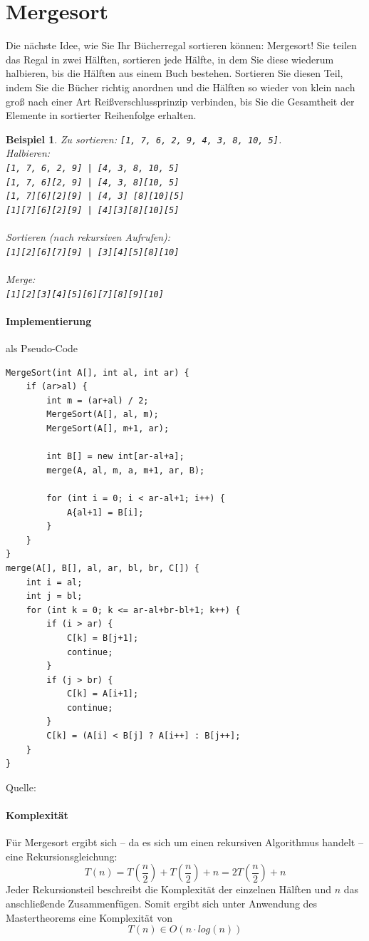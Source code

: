 \documentclass[11pt,a4paper]{scrartcl}
\newtheorem{example}{Beispiel}
\begin{document}
\section{Mergesort}
\label{mergesort}
Die nächste Idee, wie Sie Ihr Bücherregal sortieren können: Mergesort! Sie teilen das Regal in zwei Hälften, sortieren jede Hälfte, in dem Sie diese wiederum halbieren, bis die Hälften aus einem Buch bestehen. Sortieren Sie diesen Teil, indem Sie die Bücher richtig anordnen und die Hälften so wieder von klein nach groß nach einer Art Reißverschlussprinzip verbinden, bis Sie die Gesamtheit der Elemente in sortierter Reihenfolge erhalten. 
\begin{example} Zu sortieren: \texttt{[1, 7, 6, 2, 9, 4, 3, 8, 10, 5]}.\\
Halbieren: \\\texttt{[1, 7, 6, 2, 9] | [4, 3, 8, 10, 5]} \\
\texttt{[1, 7, 6][2, 9] | [4, 3, 8][10, 5]} \\
\texttt{[1, 7][6][2][9] | [4, 3] [8][10][5]} \\
\texttt{[1][7][6][2][9] | [4][3][8][10][5]}\\\\
Sortieren (nach rekursiven Aufrufen): \\
\texttt{[1][2][6][7][9] | [3][4][5][8][10]} \\\\
Merge: \\
\texttt{[1][2][3][4][5][6][7][8][9][10]}
\end{example}
\paragraph{Implementierung} als Pseudo-Code
\begin{lstlisting}
MergeSort(int A[], int al, int ar) {
	if (ar>al) {
		int m = (ar+al) / 2;
		MergeSort(A[], al, m);
		MergeSort(A[], m+1, ar);
		
		int B[] = new int[ar-al+a];
		merge(A, al, m, a, m+1, ar, B);
		
		for (int i = 0; i < ar-al+1; i++) {
			A{al+1] = B[i];		
		}
	}
}
merge(A[], B[], al, ar, bl, br, C[]) {
	int i = al;
	int j = bl;
	for (int k = 0; k <= ar-al+br-bl+1; k++) {
		if (i > ar) {
			C[k] = B[j+1];
			continue;		
		}
		if (j > br) {
			C[k] = A[i+1];
			continue;		
		}
		C[k] = (A[i] < B[j] ? A[i++] : B[j++];	
	}	
}
\end{lstlisting} Quelle: \parencite[][S. 28]{Taschenbuch}
\paragraph{Komplexität}
Für Mergesort ergibt sich -- da es sich um einen rekursiven Algorithmus handelt -- eine Rekursionsgleichung:
\[T(n) = T(\frac{n}{2}) + T(\frac{n}{2}) + n = 2T(\frac{n}{2}) + n\]
Jeder Rekursionsteil beschreibt die Komplexität der einzelnen Hälften und $n$ das anschließende Zusammenfügen. Somit ergibt sich unter Anwendung des Mastertheorems eine Komplexität von 
\[T(n) \in O(n \cdot log(n))\]
\end{document}
